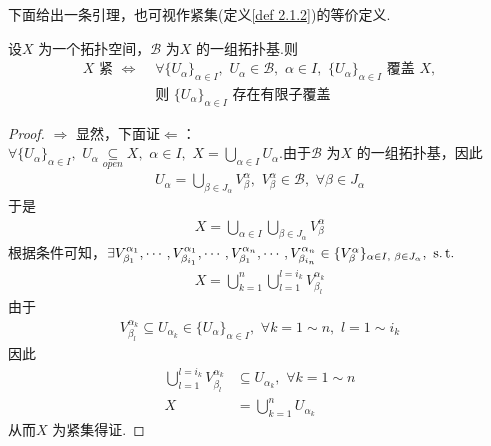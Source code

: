 	\vspace*{2em}
	下面给出一条引理，也可视作紧集(定义\ref{def 2.1.2})的等价定义.
	\begin{lemma}\label{lemma 2.2.1}
		设$X$ 为一个拓扑空间，$\mathcal{B}$ 为$X$ 的一组拓扑基.则
		\begin{align}
			X \,\, \text{紧} \,\, \Leftrightarrow \,\, &\forall 
			\{ U_\alpha \}_{\alpha \in I} , \,\, U_\alpha \in \mathcal{B} , \,\, \alpha \in I , \,\, 
			\{ U_\alpha \}_{\alpha \in I} \,\, \text{覆盖} \,\, X , \\
			&\text{则} \,\, \{ U_\alpha \}_{\alpha \in I} \,\, \text{存在有限子覆盖}
		\end{align}
		
		\vspace*{2em}
		\begin{proof}
			$\Rightarrow$ 显然，下面证$\Leftarrow$：\\
			$\forall \{ U_\alpha \}_{\alpha \in I} , \,\, U_\alpha \underset{open}{\subseteq}{X} , \,\, \alpha \in I , \,\, X = \underset{\alpha \in I}{\bigcup}{U_\alpha}$.由于$\mathcal{B}$ 为$X$ 的一组拓扑基，因此
			\begin{align}
				U_\alpha = \bigcup_{\beta \in J_\alpha}{V_{\beta}^{\alpha}} , \,\, V_{\beta}^{\alpha} \in \mathcal{B} , \,\, \forall \beta \in J_{\alpha}
			\end{align}
			于是
			\begin{align}
				X = \bigcup_{\alpha \in I}{\bigcup_{\beta \in J_\alpha}{V_{\beta}^{\alpha}}}
			\end{align}
			根据条件可知，$\exists V_{\beta_1}^{\alpha_1} , \cdots , V_{\beta_{i_1}}^{\alpha_1} , \cdots , V_{\beta_{1}}^{\alpha_n} , \cdots , V_{\beta_{i_n}}^{\alpha_n} \in \{ V_{\beta}^{\alpha} \}_{\alpha \in I , \,\, \beta \in J_\alpha} , \,\, \operatorname{s.t.}$
			\begin{align}
				X = \bigcup_{k = 1}^{n}{\bigcup_{l = 1}^{l = i_k}{V_{\beta_l}^{\alpha_k}}}
			\end{align}
			由于
			\begin{align}
				V_{\beta_l}^{\alpha_k} \subseteq U_{\alpha_k} \in \{ U_\alpha \}_{\alpha \in I} , \,\, \forall k = 1 \sim n , \,\, l = 1 \sim i_k
			\end{align}
			因此
			\begin{align}
				\bigcup_{l = 1}^{l = i_k}{V_{\beta_l}^{\alpha_k}} &\subseteq U_{\alpha_k} , \,\, \forall k = 1 \sim n\\
				X &= \bigcup_{k = 1}^{n}{U_{\alpha_k}}
			\end{align}
			从而$X$ 为紧集得证.
		\end{proof}
	\end{lemma}

